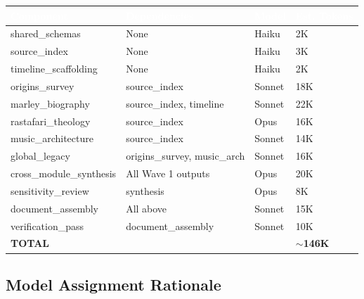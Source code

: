 \documentclass[11pt,letterpaper]{article}
\newcommand{\tableheader}[1]{\textbf{\sffamily\textcolor{white}{#1}}}
\begin{document}
\begin{center}
\begin{tabularx}{\textwidth}{L{3cm}L{3cm}C{1.5cm}C{2cm}}
\toprule
{}
\tableheader{Component} & \tableheader{Dependencies} & \tableheader{Model} & \tableheader{Est. Tokens} \\
\midrule
shared\_schemas & None & Haiku & 2K \\
source\_index & None & Haiku & 3K \\
timeline\_scaffolding & None & Haiku & 2K \\
origins\_survey & source\_index & Sonnet & 18K \\
marley\_biography & source\_index, timeline & Sonnet & 22K \\
rastafari\_theology & source\_index & Opus & 16K \\
music\_architecture & source\_index & Sonnet & 14K \\
global\_legacy & origins\_survey, music\_arch & Sonnet & 16K \\
cross\_module\_synthesis & All Wave 1 outputs & Opus & 20K \\
sensitivity\_review & synthesis & Opus & 8K \\
document\_assembly & All above & Sonnet & 15K \\
verification\_pass & document\_assembly & Sonnet & 10K \\
\midrule
\textbf{TOTAL} & & & \textbf{$\sim$146K} \\
\bottomrule
\end{tabularx}
\end{center}

\subsection{Model Assignment Rationale}
\end{document}
